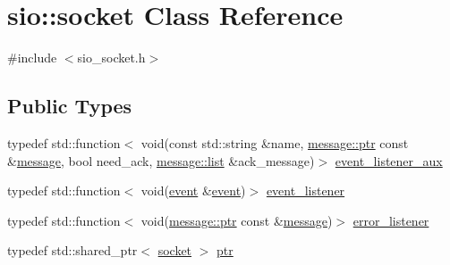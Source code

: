 \hypertarget{classsio_1_1socket}{}\section{sio\+:\+:socket Class Reference}
\label{classsio_1_1socket}


{\ttfamily \#include $<$sio\+\_\+socket.\+h$>$}

\subsection*{Public Types}
\begin{DoxyCompactItemize}
\item 
typedef std\+::function$<$ void(const std\+::string \&name, \hyperlink{classsio_1_1message_a6340b6fef57e4516eb17928b1885a615}{message\+::ptr} const  \&\hyperlink{classsio_1_1message}{message}, bool need\+\_\+ack, \hyperlink{classsio_1_1message_1_1list}{message\+::list} \&ack\+\_\+message)$>$ \hyperlink{classsio_1_1socket_a426d9236f95762375d3b86caa2b4faaf}{event\+\_\+listener\+\_\+aux}
\item 
typedef std\+::function$<$ void(\hyperlink{classsio_1_1event}{event} \&\hyperlink{classsio_1_1event}{event})$>$ \hyperlink{classsio_1_1socket_ae0b1d93ef97af0d6d4f588e1e2a103b5}{event\+\_\+listener}
\item 
typedef std\+::function$<$ void(\hyperlink{classsio_1_1message_a6340b6fef57e4516eb17928b1885a615}{message\+::ptr} const  \&\hyperlink{classsio_1_1message}{message})$>$ \hyperlink{classsio_1_1socket_aecfea28271032e09dde1567bbfa97898}{error\+\_\+listener}
\item 
typedef std\+::shared\+\_\+ptr$<$ \hyperlink{classsio_1_1socket}{socket} $>$ \hyperlink{classsio_1_1socket_afb4f5829acfc5c8181ddb7174c501593}{ptr}
\end{DoxyCompactItemize}

